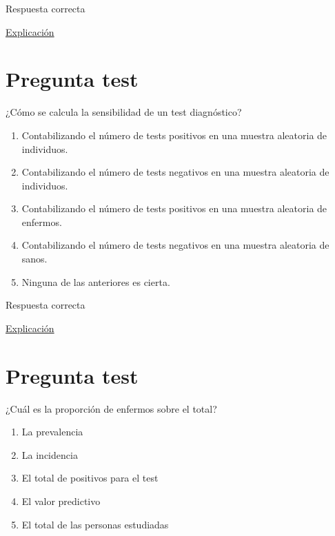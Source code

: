 \documentclass[
]{book}
\providecommand{\tightlist}{%
  \setlength{\itemsep}{0pt}\setlength{\parskip}{0pt}}
\begin{document}
Respuesta correcta

\href{https://1fjmanzano.github.io/bioestadistica/relaci\%C3\%B3n-entre-variables-cualitativas.html\#diagno\%CC\%81stico-cli\%CC\%81nico}{Explicación}

\hypertarget{pregunta-test-159}{%
\section{Pregunta test}\label{pregunta-test-159}}

¿Cómo se calcula la sensibilidad de un test diagnóstico?

\begin{enumerate}
\def\labelenumi{\alph{enumi})}
\tightlist
\item
  Contabilizando el número de tests positivos en una muestra aleatoria de individuos.
\item
  Contabilizando el número de tests negativos en una muestra aleatoria de individuos.
\item
  Contabilizando el número de tests positivos en una muestra aleatoria de enfermos.
\item
  Contabilizando el número de tests negativos en una muestra aleatoria de sanos.
\item
  Ninguna de las anteriores es cierta.
\end{enumerate}

Respuesta correcta

\href{https://1fjmanzano.github.io/bioestadistica/relaci\%C3\%B3n-entre-variables-cualitativas.html\#diagno\%CC\%81stico-cli\%CC\%81nico}{Explicación}

\hypertarget{pregunta-test-160}{%
\section{Pregunta test}\label{pregunta-test-160}}

¿Cuál es la proporción de enfermos sobre el total?

\begin{enumerate}
\def\labelenumi{\alph{enumi})}
\tightlist
\item
  La prevalencia
\item
  La incidencia
\item
  El total de positivos para el test
\item
  El valor predictivo
\item
  El total de las personas estudiadas
\end{enumerate}
\end{document}
